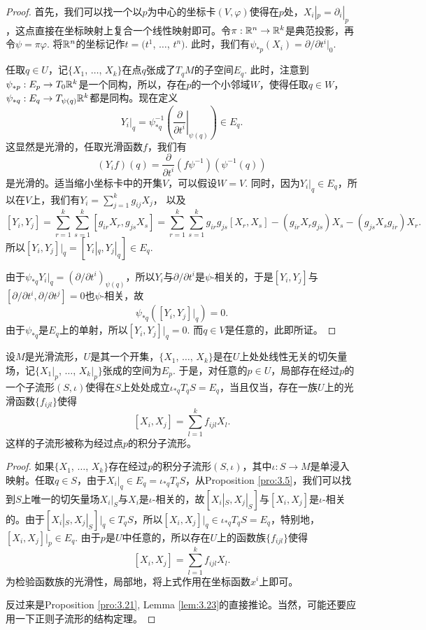 \begin{proof}
首先，我们可以找一个以$p$为中心的坐标卡$(V,\varphi)$使得在$p$处，$X_i|_p=\partial_i|_p$，这点直接在坐标映射上复合一个线性映射即可。令$\pi:\mathbb{R}^n\to\mathbb{R}^k$是典范投影，再令$\psi=\pi \varphi$. 将$\mathbb{R}^n$的坐标记作$t=(t^1$, $\dots$, $t^n)$. 此时，我们有$\psi_{*p}(X_i)=\partial/\partial t^i|_{0}$.

任取$q\in U$，记$\{X_1$, $\dots$, $X_k\}$在点$q$张成了$T_q M$的子空间$E_q$. 此时，注意到$\psi_{*p}:E_p\to T_{0}\mathbb{R}^k$是一个同构，所以，存在$p$的一个小邻域$W$，使得任取$q\in W$，$\psi_{*q}:E_q\to T_{\psi(q)}\mathbb{R}^k$都是同构。现在定义
\[
	Y_i|_q=\psi_{*q}^{-1}\left(\left.\frac \partial{\partial t^i}\right|_{\psi(q)}\right)\in E_q.
\]
这显然是光滑的，任取光滑函数$f$，我们有
\[
	(Y_if)(q)=\frac \partial{\partial t^i}(f\psi^{-1})\left(\psi^{-1}(q)\right)
\]
是光滑的。适当缩小坐标卡中的开集$V$，可以假设$W=V$. 同时，因为$Y_i|_q\in E_q$，所以在$V$上，我们有$Y_i=\sum_{j=1}^k g_{ij}X_j$，
以及
\[
	[Y_i,Y_j]=\sum_{r=1}^k\sum_{s=1}^k [g_{ir}X_r,g_{js}X_s]=\sum_{r=1}^k\sum_{s=1}^k g_{ir}g_{js}[X_r,X_s]-(g_{ir}X_rg_{js})X_s-(g_{js}X_sg_{ir})X_r.
\]
所以$[Y_i,Y_j]|_q=[Y_i|_q,Y_j|_q]\in E_q$.

由于$\psi_{*q}Y_i|_q=(\partial/{\partial t^i})_{\psi(q)}$，所以$Y_i$与$\partial/{\partial t^i}$是$\psi$-相关的，于是$[Y_i, Y_j]$与$[\partial/{\partial t^i},\partial/{\partial t^j}]=0$也$\psi$-相关，故
\[
	\psi_{*q}([Y_i,Y_j]|_q)=0.
\]
由于$\psi_{*q}$是$E_q$上的单射，所以$[Y_i,Y_j]|_q=0$. 而$q\in V$是任意的，此即所证。
\end{proof}

\begin{thm}[局部Frobenius定理]\label{frobenius}
设$M$是光滑流形，$U$是其一个开集，$\{X_1$, $\dots$, $X_k\}$是在$U$上处处线性无关的切矢量场，记$\{X_1|_p$, $\dots$, $X_k|_p\}$张成的空间为$E_p$. 于是，对任意的$p\in U$，局部存在经过$p$的一个子流形$(S,\iota)$使得在$S$上处处成立$\iota_{*q}T_q S=E_q$，当且仅当，存在一族$U$上的光滑函数$\{f_{ijl}\}$使得
\[
	[X_i,X_j]=\sum_{l=1}^k f_{ijl}X_l.
\]
这样的子流形被称为经过点$p$的积分子流形。
\end{thm}

\begin{proof}
如果$\{X_1$, $\dots$, $X_k\}$存在经过$p$的积分子流形$(S,\iota)$，其中$\iota:S\to M$是单浸入映射。任取$q\in S$，由于$X_i|_q\in E_q=\iota_{*q}T_q S$，从Proposition \ref{pro:3.5}，我们可以找到$S$上唯一的切矢量场$X_i|_S$与$X_i$是$\iota$-相关的，故$[X_i|_S,X_j|_S]$与$[X_i,X_j]$是$\iota$-相关的。由于$[X_i|_S,X_j|_S]|_q\in T_qS$，所以$[X_i,X_j]|_q\in \iota_{*q}T_q S=E_q$，特别地，$[X_i,X_j]|_p\in E_q$. 由于$p$是$U$中任意的，所以存在$U$上的函数族$\{f_{ijl}\}$使得
\[
	[X_i,X_j]=\sum_{l=1}^k f_{ijl}X_l.
\]
为检验函数族的光滑性，局部地，将上式作用在坐标函数$x^i$上即可。

反过来是Proposition \ref{pro:3.21}, Lemma \ref{lem:3.23}的直接推论。当然，可能还要应用一下正则子流形的结构定理。
\end{proof}

